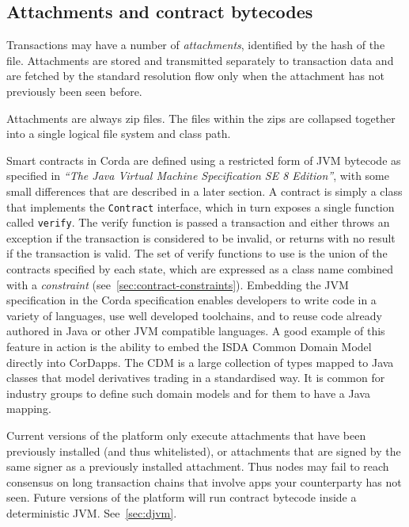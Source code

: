 \documentclass{article}
\begin{document}
\subsection{Attachments and contract bytecodes}\label{subsec:attachments-and-contract-bytecodes}

Transactions may have a number of \emph{attachments}, identified by the hash of the file. Attachments are stored
and transmitted separately to transaction data and are fetched by the standard resolution flow only when the
attachment has not previously been seen before.

Attachments are always zip files\cite{ZipFormat}. The files within the zips are collapsed together into a single
logical file system and class path.

Smart contracts in Corda are defined using a restricted form of JVM bytecode as specified in \emph{``The Java
Virtual Machine Specification SE 8 Edition''}\cite{JVM}, with some small differences that are described in a later
section. A contract is simply a class that implements the \texttt{Contract} interface, which in turn exposes a
single function called \texttt{verify}. The verify function is passed a transaction and either throws an exception
if the transaction is considered to be invalid, or returns with no result if the transaction is valid. The set of
verify functions to use is the union of the contracts specified by each state, which are expressed as a class name
combined with a \emph{constraint} (see~\cref{sec:contract-constraints}). Embedding the JVM specification in the
Corda specification enables developers to write code in a variety of languages, use well developed toolchains, and
to reuse code already authored in Java or other JVM compatible languages. A good example of this feature in action
is the ability to embed the ISDA Common Domain Model\cite{ISDACDM} directly into CorDapps. The CDM is 
a large collection of types mapped to Java classes that model derivatives trading in a standardised way. It is 
common for industry groups to define such domain models and for them to have a Java mapping.

Current versions of the platform only execute attachments that have been previously installed (and thus
whitelisted), or attachments that are signed by the same signer as a previously installed attachment. Thus nodes
may fail to reach consensus on long transaction chains that involve apps your counterparty has not seen. Future
versions of the platform will run contract bytecode inside a deterministic JVM. See~\cref{sec:djvm}.
\end{document}
